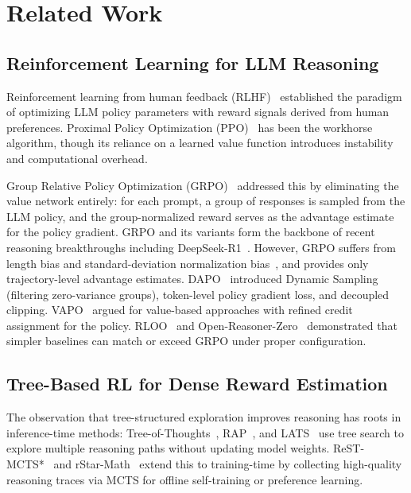 \documentclass{article} %
\begin{document}
\section{Related Work}
\label{sec:related}

\subsection{Reinforcement Learning for LLM Reasoning}

Reinforcement learning from human feedback (RLHF)~\citep{rlhf} established the paradigm of optimizing LLM policy parameters with reward signals derived from human preferences. Proximal Policy Optimization (PPO)~\citep{ppo} has been the workhorse algorithm, though its reliance on a learned value function introduces instability and computational overhead.

Group Relative Policy Optimization (GRPO)~\citep{deepseekmathgrpo} addressed this by eliminating the value network entirely: for each prompt, a group of responses is sampled from the LLM policy, and the group-normalized reward serves as the advantage estimate for the policy gradient. GRPO and its variants form the backbone of recent reasoning breakthroughs including DeepSeek-R1~\citep{guo2025deepseek}. However, GRPO suffers from length bias and standard-deviation normalization bias~\citep{drgrpo}, and provides only trajectory-level advantage estimates. DAPO~\citep{dapo} introduced Dynamic Sampling (filtering zero-variance groups), token-level policy gradient loss, and decoupled clipping. VAPO~\citep{vapo} argued for value-based approaches with refined credit assignment for the policy. RLOO~\citep{rloo} and Open-Reasoner-Zero~\citep{openreasonerzero} demonstrated that simpler baselines can match or exceed GRPO under proper configuration.

\subsection{Tree-Based RL for Dense Reward Estimation}

The observation that tree-structured exploration improves reasoning has roots in inference-time methods: Tree-of-Thoughts~\citep{treeofthoughts}, RAP~\citep{rap}, and LATS~\citep{lats} use tree search to explore multiple reasoning paths without updating model weights. ReST-MCTS*~\citep{restmcts} and rStar-Math~\citep{rstarmath} extend this to training-time by collecting high-quality reasoning traces via MCTS for offline self-training or preference learning.
\end{document}
